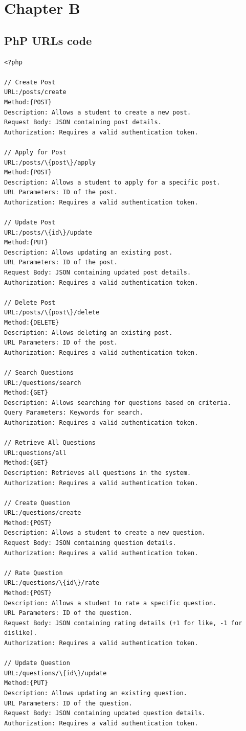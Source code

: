 \chapter{Chapter B}\label{app:BB}
\section{PhP URLs code}
\begin{lstlisting}[style=php, caption={PHP URLs code}]
<?php

// Create Post
URL:/posts/create
Method:{POST}
Description: Allows a student to create a new post.
Request Body: JSON containing post details.
Authorization: Requires a valid authentication token.

// Apply for Post
URL:/posts/\{post\}/apply
Method:{POST}
Description: Allows a student to apply for a specific post.
URL Parameters: ID of the post.
Authorization: Requires a valid authentication token.

// Update Post
URL:/posts/\{id\}/update
Method:{PUT}
Description: Allows updating an existing post.
URL Parameters: ID of the post.
Request Body: JSON containing updated post details.
Authorization: Requires a valid authentication token.

// Delete Post
URL:/posts/\{post\}/delete
Method:{DELETE}
Description: Allows deleting an existing post.
URL Parameters: ID of the post.
Authorization: Requires a valid authentication token.

// Search Questions
URL:/questions/search
Method:{GET}
Description: Allows searching for questions based on criteria.
Query Parameters: Keywords for search.
Authorization: Requires a valid authentication token.

// Retrieve All Questions
URL:questions/all
Method:{GET}
Description: Retrieves all questions in the system.
Authorization: Requires a valid authentication token.

// Create Question
URL:/questions/create
Method:{POST}
Description: Allows a student to create a new question.
Request Body: JSON containing question details.
Authorization: Requires a valid authentication token.

// Rate Question
URL:/questions/\{id\}/rate
Method:{POST}
Description: Allows a student to rate a specific question.
URL Parameters: ID of the question.
Request Body: JSON containing rating details (+1 for like, -1 for dislike).
Authorization: Requires a valid authentication token.

// Update Question
URL:/questions/\{id\}/update
Method:{PUT}
Description: Allows updating an existing question.
URL Parameters: ID of the question.
Request Body: JSON containing updated question details.
Authorization: Requires a valid authentication token.


\end{lstlisting}
